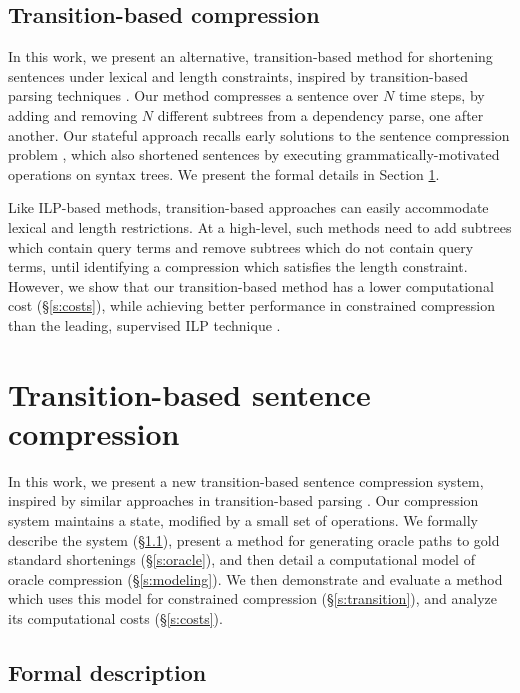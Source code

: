 \documentclass[11pt,a4paper]{article}
\begin{document}
\begin{table}[]
\label{t:ops}
\end{table}

\subsection{Transition-based compression}

In this work, we present an alternative, transition-based method for shortening sentences under lexical and length constraints, inspired by transition-based parsing techniques \cite{Earley1970AnEC,nivre2003}. Our method compresses a sentence over $N$ time steps, by adding and removing $N$ different subtrees from a dependency parse, one after another. Our stateful approach recalls early solutions to the sentence compression problem \cite{Jing2000SentenceRF,Knight2000StatisticsBasedS}, which also shortened sentences by executing grammatically-motivated operations on syntax trees. We present the formal details in Section \ref{s:system}. 

Like ILP-based methods, transition-based approaches can easily accommodate lexical and length restrictions. At a high-level, such methods need to add subtrees which contain query terms and remove subtrees which do not contain query terms, until identifying a compression which satisfies the length constraint. However, we show that our transition-based method has a lower computational cost (\S\ref{s:costs}), while achieving better performance in constrained compression than the leading, supervised ILP technique \cite{filippova2013overcoming}.

\section{Transition-based sentence compression}\label{s:system}

In this work, we present a new transition-based sentence compression system, inspired by similar approaches in transition-based parsing \cite{nivre2003,D14-1082}. Our compression system maintains a state, modified by a small set of operations. We formally describe the system (\S\ref{s:formal}), present a method for generating oracle paths to gold standard shortenings (\S\ref{s:oracle}), and then detail a computational model of oracle compression (\S\ref{s:modeling}). We then demonstrate and evaluate a method which uses this model for constrained compression (\S\ref{s:transition}), and analyze its computational costs (\S\ref{s:costs}).

\subsection{Formal description}\label{s:formal}
\end{document}
